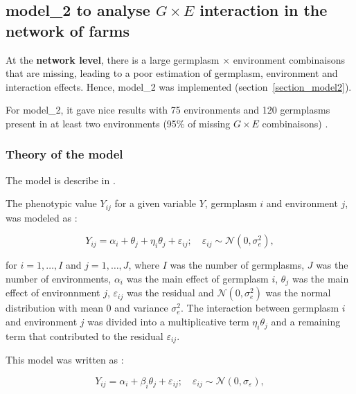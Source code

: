 \documentclass{article}\usepackage[]{graphicx}\usepackage[]{color}
\begin{document}
\newpage


\subsection{model\_2 to analyse $G \times E$ interaction in the network of farms }
\label{model_2}

At the \textbf{network level}, there is a large germplasm $\times$ environment combinaisons that are missing, leading to a poor estimation of germplasm, environment and interaction effects.
Hence, model\_2 was implemented (section~\ref{section_model2}).

For model\_2, it gave nice results with 75 environments and 120 germplasms present in at least two environments (95\% of missing $G \times E$ combinaisons) \citep{riviere_hierarchical_2016}.


\subsubsection{Theory of the model}
The model is describe in \citet{riviere_hierarchical_2016}.

The phenotypic value $Y_{ij}$ for a given variable $Y$, germplasm $i$ and environment $j$, was modeled as :

\begin{displaymath}
Y_{ij} = \alpha_{i} + \theta_{j} + \eta_{i}\theta_{j} + \varepsilon_{ij} ; \quad \varepsilon_{ij} \sim \mathcal{N} (0,\sigma^2_{e}),
\label{modele_gxe}
\end{displaymath}

for $i = 1,\ldots, I$ and $j = 1,\ldots, J$, where 
$I$ was the number of germplasms, 
$J$ was the number of environments,
$\alpha_{i}$ was the main effect of germplasm $i$,
$\theta_{j}$ was the main effect of environnment $j$,
$\varepsilon_{ij}$ was the residual and 
$\mathcal{N} (0,\sigma^2_{e})$ was the normal distribution with mean 0 and variance $\sigma^2_{e}$.
The interaction between germplasm $i$ and environment $j$ was divided into a multiplicative term $\eta_{i}\theta_{j}$ and a remaining term that contributed to the residual $\varepsilon_{ij}$.

This model was written as :

\begin{equation}
Y_{ij}  = \alpha_{i} + \beta_{i} \theta_{j} + \varepsilon_{ij}; \quad \varepsilon_{ij} \sim \mathcal{N} (0,\sigma_{\varepsilon}),
	\label{model2}
\end{equation}
\end{document}
